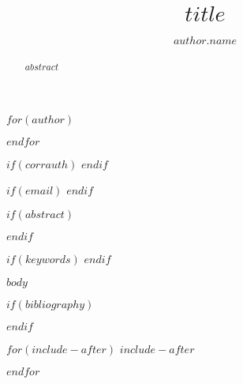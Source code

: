 \documentclass[$if(documentclass)$$documentclass$$else$article$endif$$if(classoption)$,$classoption$$endif$]{JASA-El}
\begin{document}
\title[$runningtitle$]{$title$}

$for(author)$
 \author{$author.name$}
$endfor$

$if(corrauth)$
$endif$

$if(email)$
$endif$

$if(abstract)$
 \begin{abstract}
$abstract$
 \end{abstract}
$endif$

$if(keywords)$
$endif$



\maketitle

$body$

$if(bibliography)$


$endif$

$for(include-after)$
$include-after$

$endfor$
\end{document}
